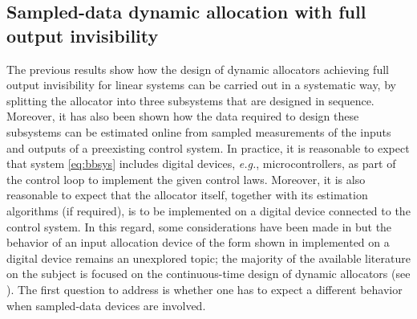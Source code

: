 

\subsection{Sampled-data dynamic allocation with full output invisibility}
\label{sec:all_design_sd}
The previous results show how the design of dynamic allocators achieving full output invisibility for linear systems can be carried out in a systematic way, by splitting the allocator into three subsystems that are designed in sequence. Moreover, it has also been shown how the data required to design these subsystems can be estimated online from sampled measurements of the inputs and outputs of a preexisting control system. In practice, it is reasonable to expect that system \eqref{eq:bbsys} includes digital devices, \emph{e.g.}, microcontrollers, as part of the control loop to implement the given control laws. Moreover, it is also reasonable to expect that the allocator itself, together with its estimation algorithms (if required), is to be implemented on a digital device connected to the control system. In this regard, some considerations have been made in  but the behavior of an input allocation device of the form shown in  implemented on a digital device remains an unexplored topic; the majority of the available literature on the subject is focused on the continuous-time design of dynamic allocators (see ). The first question to address is whether one has to expect a different behavior when sampled-data devices are involved.


